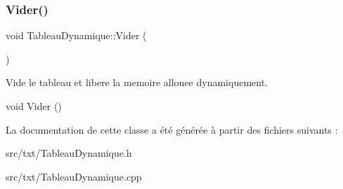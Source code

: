 \subsubsection{\texorpdfstring{Vider()}{Vider()}}
{\footnotesize\ttfamily void Tableau\+Dynamique\+::\+Vider (\begin{DoxyParamCaption}{ }\end{DoxyParamCaption})}



Vide le tableau et libere la memoire allouee dynamiquement. 

void Vider () 

La documentation de cette classe a été générée à partir des fichiers suivants \+:\begin{DoxyCompactItemize}
\item 
src/txt/Tableau\+Dynamique.\+h\item 
src/txt/Tableau\+Dynamique.\+cpp\end{DoxyCompactItemize}

